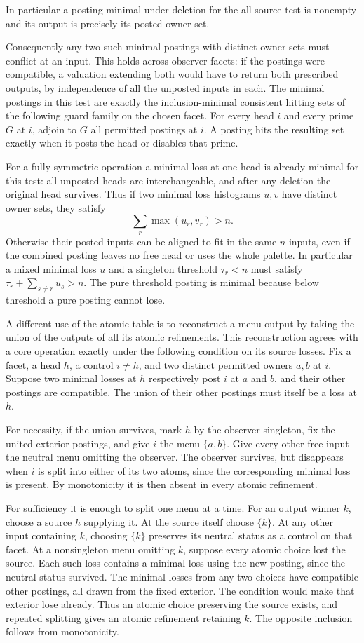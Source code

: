 In particular a posting minimal under deletion for the
all-source test is nonempty and its output is precisely its
posted owner set.

Consequently any two such minimal postings with distinct owner
sets must conflict at an input. This holds across observer facets:
if the postings were compatible, a valuation extending both
would have to return both prescribed outputs, by independence
of all the unposted inputs in each. The minimal postings in this
test are exactly the inclusion-minimal consistent hitting sets
of the following guard family on the chosen facet. For every
head $i$ and every prime $G$ at $i$, adjoin to $G$ all permitted
postings at $i$. A posting hits the resulting set exactly when
it posts the head or disables that prime.

For a fully symmetric operation a minimal loss at one head is
already minimal for this test: all unposted heads are
interchangeable, and after any deletion the original head
survives. Thus if two minimal loss histograms $u,v$ have distinct
owner sets, they satisfy
\[
                  \sum_r\max(u_r,v_r)>n .
\]
Otherwise their posted inputs can be aligned to fit in the same
$n$ inputs, even if the combined posting leaves no free head or
uses the whole palette. In particular a mixed minimal loss $u$
and a singleton threshold $\tau_r<n$ must satisfy
$\tau_r+\sum_{s\ne r}u_s>n$. The pure threshold posting is
minimal because below threshold a pure posting cannot lose.

A different use of the atomic table is to reconstruct a menu
output by taking the union of the outputs of all its atomic
refinements. This reconstruction agrees with a core operation
exactly under the following condition on its source losses.
Fix a facet, a head $h$, a control $i\ne h$, and two distinct
permitted owners $a,b$ at $i$. Suppose two minimal losses at
$h$ respectively post $i$ at $a$ and $b$, and their other
postings are compatible. The union of their other postings
must itself be a loss at $h$.

For necessity, if the union survives, mark $h$ by the
observer singleton, fix the united exterior postings, and
give $i$ the menu $\{a,b\}$. Give every other free input the
neutral menu omitting the observer. The observer survives,
but disappears when $i$ is split into either of its two
atoms, since the corresponding minimal loss is present.
By monotonicity it is then absent in every atomic refinement.

For sufficiency it is enough to split one menu at a time.
For an output winner $k$, choose a source $h$ supplying it.
At the source itself choose $\{k\}$. At any other input
containing $k$, choosing $\{k\}$ preserves its neutral
status as a control on that facet. At a nonsingleton menu
omitting $k$, suppose every atomic choice lost the source.
Each such loss contains a minimal loss using the new
posting, since the neutral status survived. The minimal
losses from any two choices have compatible other postings,
all drawn from the fixed exterior. The condition would make
that exterior lose already. Thus an atomic choice preserving
the source exists, and repeated splitting gives an atomic
refinement retaining $k$. The opposite inclusion follows
from monotonicity.

